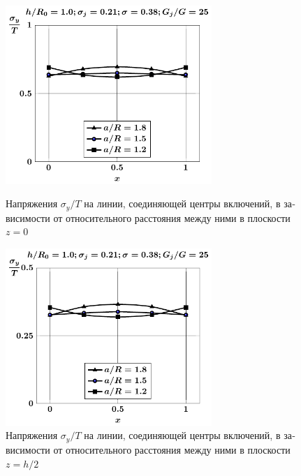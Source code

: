 \begin{russian}
\begin{figure}[h!]
\centering\footnotesize
\parbox[b]{7.5cm}{\centering\includegraphics[width=7.8cm]{inc16-a-h10-r10-g25-z0-sig-y.pdf}
\caption{Напряжения $\sigma_y/T$ на линии, соединяющей центры включений, в зависимости от относительного расстояния между ними в плоскости $z=0$
\label{fig:4}}}\hfil\hfil
\parbox[b]{7.5cm}{\centering\includegraphics[width=7.8cm]{inc16-a-h10-r10-g25-z1-sig-y.pdf}
\caption{Напряжения $\sigma_y/T$ на линии, соединяющей центры включений, в зависимости от относительного расстояния между ними в плоскости $z=h/2$
\label{fig:5}
}}
\end{figure}


\end{russian}
